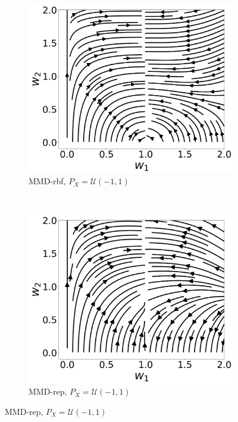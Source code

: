 \documentclass{article} %
\theoremstyle{plain}
\newtheorem*{proposition 1*}{Proposition 1}
\newcommand{\ds}[1]{\mathcal{#1}}  %
\begin{document}
\begin{appendices}
\begin{figure}[tb]
	\centering
	\begin{subfigure}[t]{0.4\textwidth}
		\centering
		\includegraphics[width=1\textwidth]{mmd_stream_uvu.png}
		\caption{MMD-rbf, \(P_X=\ds{U}(-1,1)\)\label{fig:u_vs_u}}
	\end{subfigure}
	~
	\begin{subfigure}[t]{0.4\textwidth}
		\centering
		\includegraphics[width=1\textwidth]{rep_stream_uvu.png}
		\caption{MMD-rep, \(P_X=\ds{U}(-1,1)\)\label{fig:u_vs_u_rep}}
	\end{subfigure}
	

\end{figure}
\end{appendices}
\end{document}
